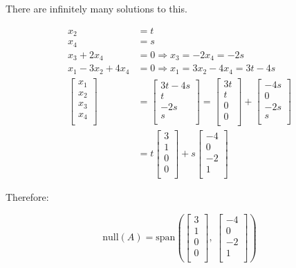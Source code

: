 \documentclass[12pt]{article}
\theoremstyle{plain}
\theoremstyle{remark}
\theoremstyle{definition}
\begin{document}
There are infinitely many solutions to this.

\begin{align*}
x_{2} &= t \\
x_{4} &= s \\
x_{3} + 2x_{4} &= 0 \Rightarrow x_{3} = - 2x_{4} = - 2s \\
x_{1} - 3x_{2} + 4x_{4} &= 0 \Rightarrow x_{1} = 3x_{2} - 4x_{4} = 3t - 4s
 \\
\begin{bmatrix}x_{1} \\x_{2} \\x_{3} \\x_{4} \\\end{bmatrix} &= \begin{bmatrix}3t - 4s \\t \\ - 2s \\s \\\end{bmatrix} = \begin{bmatrix}3t \\t \\0 \\0 \\\end{bmatrix} + \begin{bmatrix} - 4s \\0 \\ - 2s \\s \\\end{bmatrix} \\
&= t\begin{bmatrix}3 \\1 \\0 \\0 \\\end{bmatrix} + s\begin{bmatrix} - 4 \\0 \\ - 2 \\1 \\\end{bmatrix}
\end{align*}


Therefore:

\[\text{null}(A) = \text{span}\left( \begin{bmatrix}
3 \\
1 \\
0 \\
0 \\
\end{bmatrix},\ \begin{bmatrix}
 - 4 \\
0 \\
 - 2 \\
1 \\
\end{bmatrix} \right)\]
\end{document}
